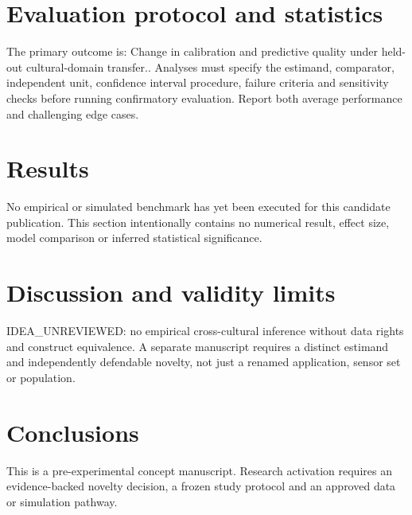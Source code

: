 \documentclass[11pt,a4paper]{article}
\begin{document}
\section{Evaluation protocol and statistics}
The primary outcome is: Change in calibration and predictive quality under held-out cultural-domain transfer.. Analyses must specify the estimand, comparator, independent unit, confidence interval procedure, failure criteria and sensitivity checks before running confirmatory evaluation. Report both average performance and challenging edge cases.
\section{Results}
No empirical or simulated benchmark has yet been executed for this candidate publication. This section intentionally contains no numerical result, effect size, model comparison or inferred statistical significance.
\section{Discussion and validity limits}
IDEA\_UNREVIEWED: no empirical cross-cultural inference without data rights and construct equivalence. A separate manuscript requires a distinct estimand and independently defendable novelty, not just a renamed application, sensor set or population.
\section{Conclusions}
This is a pre-experimental concept manuscript. Research activation requires an evidence-backed novelty decision, a frozen study protocol and an approved data or simulation pathway.
\end{document}
